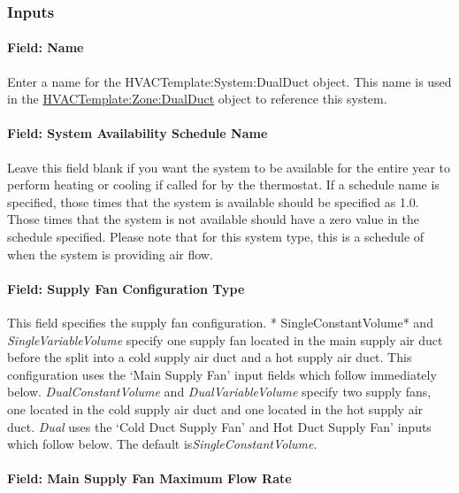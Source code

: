 \subsubsection{Inputs}\label{inputs-21-002}

\paragraph{Field: Name}\label{field-name-8-007}

Enter a name for the HVACTemplate:System:DualDuct object. This name is used in the \hyperref[hvactemplatezonedualduct]{HVACTemplate:Zone:DualDuct} object to reference this system.

\paragraph{Field: System Availability Schedule Name}\label{field-system-availability-schedule-name-13}

Leave this field blank if you want the system to be available for the entire year to perform heating or cooling if called for by the thermostat. If a schedule name is specified, those times that the system is available should be specified as 1.0. Those times that the system is not available should have a zero value in the schedule specified. Please note that for this system type, this is a schedule of when the system is providing air flow.

\paragraph{Field: Supply Fan Configuration Type}\label{field-supply-fan-configuration-type}

This field specifies the supply fan configuration. * SingleConstantVolume* and \emph{SingleVariableVolume} specify one supply fan located in the main supply air duct before the split into a cold supply air duct and a hot supply air duct. This configuration uses the `Main Supply Fan' input fields which follow immediately below. \emph{DualConstantVolume} and \emph{DualVariableVolume} specify two supply fans, one located in the cold supply air duct and one located in the hot supply air duct. \emph{Dual} uses the `Cold Duct Supply Fan' and Hot Duct Supply Fan' inputs which follow below. The default is\emph{SingleConstantVolume}.

\paragraph{Field: Main Supply Fan Maximum Flow Rate}\label{field-main-supply-fan-maximum-flow-rate}


